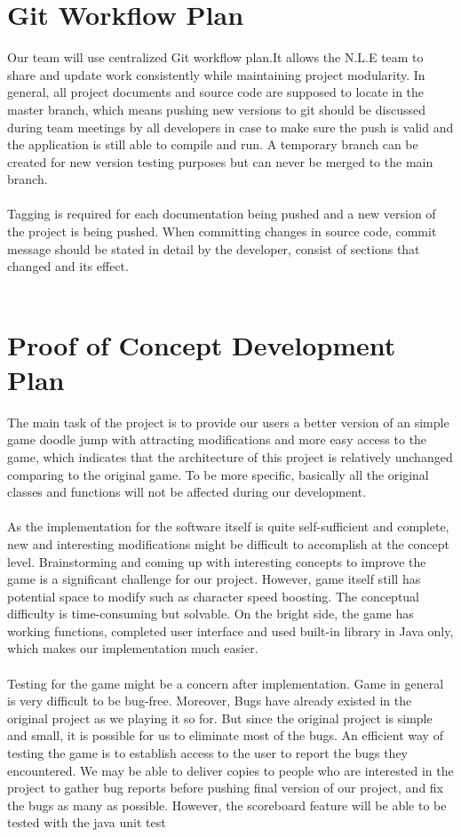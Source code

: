 \documentclass{article}
\newcommand{\rev}[1]{\textcolor{RevisionColour}{#1}}
\begin{document}
\section{Git Workflow Plan}
Our team will use centralized Git workflow plan.It allows the N.L.E team to share and update work consistently while maintaining project modularity. In general, all project documents and source code are supposed to locate in the master branch, which means pushing new versions to git should be discussed during team meetings by all developers in case to make sure the push is valid and the application is still able to compile and run. A temporary branch can be created for new version testing purposes but can never be merged to the main branch.\\\\
Tagging is required for each documentation being pushed and a new version of the project is being pushed. When committing changes in source code, commit message should be stated in detail by the developer, consist of sections that changed and its effect.\\\\
 
\section{Proof of Concept Development Plan}
The main task of the project is to provide our users a better version of an simple game doodle jump with attracting modifications and more easy access to the game, which indicates that the architecture of this project is relatively unchanged comparing to the original game. To be more specific, basically all the original classes and functions will not be affected during our development.\\\\
As the implementation for the software itself is quite self-sufficient and complete, new and interesting modifications might be difficult to accomplish at the concept level. Brainstorming and coming up with interesting concepts to improve the game is a significant challenge for our project. However, game itself still has potential space to modify such as character speed boosting. The conceptual difficulty is time-consuming but solvable. On the bright side, the game has working functions, completed user interface and used built-in library in Java only, which makes our implementation much easier.\\\\
Testing for the game might be a concern after implementation. Game in general is very difficult to be bug-free. Moreover, Bugs have already existed in the original project as we playing it so for. But since the original project is simple and small, it is possible for us to eliminate most of the bugs. An efficient way of testing the game is to establish access to the user to report the bugs they encountered. We may be able to deliver copies to people who are interested in the project to gather bug reports before pushing final version of our project, and fix the bugs as many as possible.\rev{ However, the scoreboard feature will be able to be tested with the java unit test}
\end{document}
